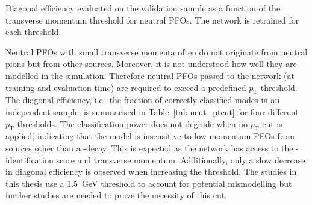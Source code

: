 \begin{table}[htb]
  \centering
  {\small}
  \caption{Diagonal efficiency evaluated on the validation sample as a function
    of the transverse momentum threshold for neutral PFOs. The network is
    retrained for each threshold.}
  \label{tab:neut_ptcut}
\end{table}

Neutral PFOs with small transverse momenta often do not originate from neutral
pions but from other sources. Moreover, it is not understood how well they are
modelled in the simulation. Therefore neutral PFOs passed to the network (at
training and evaluation time) are required to exceed a predefined
$p_\text{T}$-threshold. The diagonal efficiency, i.e.\ the fraction of correctly
classified modes in an independent sample, is summarised in
Table~\ref{tab:neut_ptcut} for four different $p_\text{T}$-thresholds. The
classification power does not degrade when no $p_\text{T}$-cut is applied,
indicating that the model is insensitive to low momentum PFOs from sources other
than a -decay. This is expected as the network has access to the
-identification score and transverse momentum. Additionally, only
a slow decrease in diagonal efficiency is observed when increasing the
threshold. The studies in this thesis use a \SI{1.5}{\giga\electronvolt}
threshold to account for potential mismodelling but further studies are needed
to prove the necessity of this cut.

